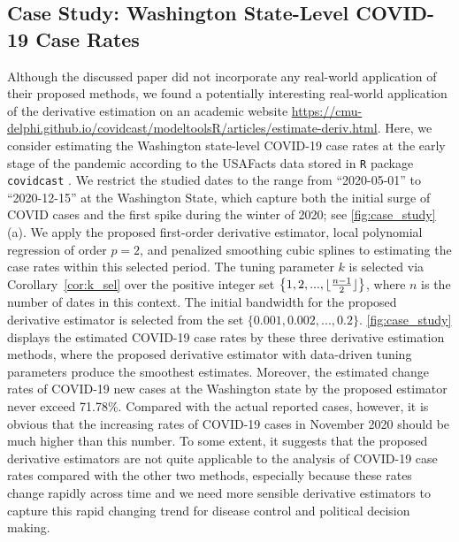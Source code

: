 \documentclass{uwstat572}
\theoremstyle{definition}
\DeclarePairedDelimiter\floor{\lfloor}{\rfloor}
\theoremstyle{theorem}
\begin{document}
\subsection{Case Study: Washington State-Level COVID-19 Case Rates}
\label{App:case_study}

Although the discussed paper did not incorporate any real-world application of their proposed methods, we found a potentially interesting real-world application of the derivative estimation on an academic website \url{https://cmu-delphi.github.io/covidcast/modeltoolsR/articles/estimate-deriv.html}. Here, we consider estimating the Washington state-level COVID-19 case rates at the early stage of the pandemic according to the USAFacts data stored in \texttt{R} package \texttt{covidcast} \citep{reinhart2021open}. We restrict the studied dates to the range from ``2020-05-01'' to ``2020-12-15'' at the Washington State, which capture both the initial surge of COVID cases and the first spike during the winter of 2020; see \autoref{fig:case_study}(a). We apply the proposed first-order derivative estimator, local polynomial regression of order $p=2$, and penalized smoothing cubic splines to estimating the case rates within this selected period. The tuning parameter $k$ is selected via Corollary~\ref{cor:k_sel} over the positive integer set $\left\{1,2,...,\floor{\frac{n-1}{2}}\right\}$, where $n$ is the number of dates in this context. The initial bandwidth for the proposed derivative estimator is selected from the set $\{0.001, 0.002,...,0.2\}$. \autoref{fig:case_study} displays the estimated COVID-19 case rates by these three derivative estimation methods, where the proposed derivative estimator with data-driven tuning parameters produce the smoothest estimates. Moreover, the estimated change rates of COVID-19 new cases at the Washington state by the proposed estimator never exceed 71.78\%. Compared with the actual reported cases, however, it is obvious that the increasing rates of COVID-19 cases in November 2020 should be much higher than this number. To some extent, it suggests that the proposed derivative estimators are not quite applicable to the analysis of COVID-19 case rates compared with the other two methods, especially because these rates change rapidly across time and we need more sensible derivative estimators to capture this rapid changing trend for disease control and political decision making.
\end{document}
